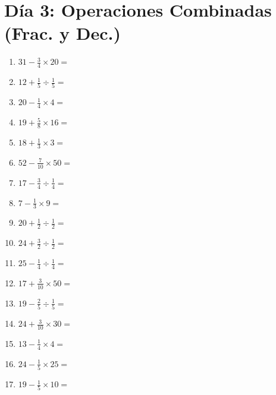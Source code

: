 \documentclass[12pt]{article}
\begin{document}
\section*{Día 3: Operaciones Combinadas (Frac. y Dec.)}
\begin{enumerate}
\item \large $ 31 - \frac{3}{4} \times 20 = $ \vspace{1.6cm}
\item \large $ 12 + \frac{1}{5} \div \frac{1}{5} = $ \vspace{1.6cm}
\item \large $ 20 - \frac{1}{4} \times 4 = $ \vspace{1.6cm}
\item \large $ 19 + \frac{5}{8} \times 16 = $ \vspace{1.6cm}
\item \large $ 18 + \frac{1}{3} \times 3 = $ \vspace{1.6cm}
\item \large $ 52 - \frac{7}{10} \times 50 = $ \vspace{1.6cm}
\item \large $ 17 - \frac{3}{4} \div \frac{1}{4} = $ \vspace{1.6cm}
\item \large $ 7 - \frac{1}{3} \times 9 = $ \vspace{1.6cm}
\item \large $ 20 + \frac{1}{2} \div \frac{1}{2} = $ \vspace{1.6cm}
\item \large $ 24 + \frac{3}{2} \div \frac{1}{2} = $ \vspace{1.6cm}
\newpage
\item \large $ 25 - \frac{1}{4} \div \frac{1}{4} = $ \vspace{1.6cm}
\item \large $ 17 + \frac{3}{10} \times 50 = $ \vspace{1.6cm}
\item \large $ 19 - \frac{2}{5} \div \frac{1}{5} = $ \vspace{1.6cm}
\item \large $ 24 + \frac{3}{10} \times 30 = $ \vspace{1.6cm}
\item \large $ 13 - \frac{1}{4} \times 4 = $ \vspace{1.6cm}
\item \large $ 24 - \frac{1}{5} \times 25 = $ \vspace{1.6cm}
\item \large $ 19 - \frac{1}{5} \times 10 = $ \vspace{1.6cm}

\end{enumerate}
\end{document}
